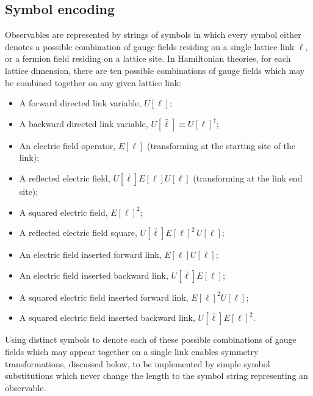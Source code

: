 \documentclass [12pt]{article}
\begin{document}
\subsection {Symbol encoding}\label{sec:symbols}

    Observables are represented by strings of symbols in which every
    symbol either denotes
    a possible combination of gauge fields residing on a single
    lattice link $\ell$, or
    a fermion field residing on a lattice site.
    In Hamiltonian theories,
    for each lattice dimension, there are ten possible
    combinations of gauge fields which may be combined together
    on any given lattice link:
    \begin{itemize}\advance\itemsep -8pt
    \item A forward directed link variable, $U[\ell]$;
    \item A backward directed link variable, $U[\bar\ell] \equiv U[\ell]^\dagger$;
    \item An electric field operator, $E[\ell]$ (transforming at the starting site of the link);
    \item A reflected electric field, $U[\bar\ell] E[\ell] U[\ell]$
	(transforming at the link end site);
    \item A squared electric field, $E[\ell]^2$;
    \item A reflected electric field square,
	$U[\bar\ell] E[\ell]^2 \, U[\ell]$;
    \item An electric field inserted forward link, $E[\ell] U[\ell]$;
    \item An electric field inserted backward link, $U[\bar\ell] E[\ell]$;
    \item A squared electric field inserted forward link, $E[\ell]^2 U[\ell]$;
    \item A squared electric field inserted backward link, $U[\bar\ell] E[\ell]^2$.
    \end{itemize}
    Using distinct symbols to denote each of these possible combinations of
    gauge fields which may appear together on a single link
    enables symmetry transformations, discussed below,
    to be implemented by simple symbol
    substitutions which never change the length to the symbol string
    representing an observable.
    
\end{document}
